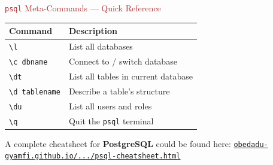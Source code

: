 



\begin{frame}{\textcolor{brown}{\texttt{psql} Meta-Commands — Quick Reference}}
  \begin{center}
    \renewcommand{\arraystretch}{1.4}
    \begin{tabular}{ll}
      \toprule
      \textbf{Command} & \textbf{Description} \\
      \midrule
      \texttt{\textbackslash l}           & List all databases \\
      \texttt{\textbackslash c dbname}    & Connect to / switch database \\
      \texttt{\textbackslash dt}          & List all tables in current database \\
      \texttt{\textbackslash d tablename} & Describe a table's structure \\
      \texttt{\textbackslash du}          & List all users and roles \\
      \texttt{\textbackslash q}           & Quit the \texttt{psql} terminal \\
      \bottomrule
    \end{tabular}
  \end{center}



  \vspace{0.5em}
    A complete cheatsheet for \textbf{PostgreSQL} could be found here: \href{https://obedadu-gyamfi.github.io/TMC/Database_Mananagement_Systems/docs/psql-cheatsheet.html}%
         {\texttt{obedadu-gyamfi.github.io/.../psql-cheatsheet.html}}
\end{frame}